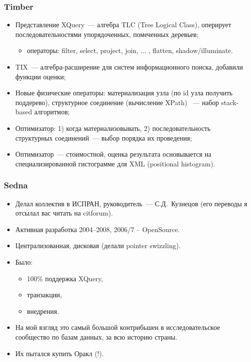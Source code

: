 \documentclass{beamer}
\begin{document}
\begin{frame}
\frametitle{Timber}

\begin{itemize}
  \setlength\itemsep{1em}
  \item Представление XQuery~--- алгебра TLC (Tree Logical Class), оперирует последовательностями упорядоченных, помеченных деревьев;

  \begin{itemize}
	\item операторы: filter, select, project, join, ... , flatten, shadow/illuminate.  	
\end{itemize}

  
  
  \item TIX~--- алгебра-расширение для систем информационного поиска, добавили функции оценки;
  \item Новые физические операторы: материализация узла (по id узла получить поддерево), структурное соединение (вычисление XPath) ~--- набор stack-based алгоритмов;
  \item Оптимизатор: 1) когда материализовывать, 2) последовательность структурных соединений~--- выбор порядка их проведения;
  \item Оптимизатор~--- стоимостной, оценка результата основывается на специализированной гистограмме для XML (positional histogram).
\end{itemize}
\end{frame}

\begin{frame}
	\frametitle{Sedna}
	
	\begin{itemize}
		\setlength\itemsep{1em}
		\item Делал коллектив в ИСПРАН, руководитель~--- С.Д.~Кузнецов (его переводы я отсылал вас читать на citforum).
		\item Активная разработка 2004--2008, 2006/7 -- OpenSource.
		\item Централизованная, дисковая (делали pointer swizzling).
		\item Было:
		\begin{itemize}
			\item 100\% поддержка XQuery,
			\item транзакции,
			\item внедрения.
		\end{itemize}
		\item На мой взгляд это самый большой контрибьшен в исследовательское сообщество по базам данных, за всю историю страны.
		\item Их пытался купить Оракл (!).
	\end{itemize}
\end{frame}
\end{document}
